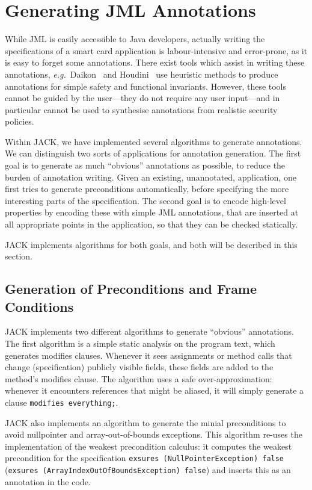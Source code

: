 \section{Generating JML Annotations}\label{SecAnnotGen}

While JML is easily accessible to Java developers, actually writing
the specifications of a smart card application is labour-intensive and
error-prone, as it is easy to forget some annotations. There
exist tools which assist in writing these annotations,
\emph{e.g.}~Daikon~\cite{ErnstCGN01} and Houdini~\cite{FlanaganL01}
use heuristic methods to produce annotations for simple safety and
functional invariants.  However, these tools cannot be guided by the
user---they do not require any user input---and in particular cannot
be used to synthesise annotations from realistic security policies.

Within JACK, we have implemented several algorithms to generate
annotations. We can distinguish two sorts of applications for
annotation generation. The first goal is to generate as much
``obvious'' annotations as possible, to reduce the burden of
annotation writing. Given an existing, unannotated, application, one
first tries to generate preconditions automatically, before specifying
the more interesting parts of the specification. The second goal is to
encode high-level properties by encoding these with simple JML
annotations, that are inserted at all appropriate points in the
application, so that they can be checked statically.

JACK implements algorithms for both goals, and both will be described
in this section.


\subsection{Generation of Preconditions and Frame Conditions}
JACK implements two different algorithms to generate ``obvious''
annotations. The first algorithm is a simple static analysis on the
program text, which generates modifies clauses. Whenever it sees
assignments or method calls that change (specification) publicly
visible fields, these fields are added to the method's modifies
clause. The algorithm uses a safe over-approximation: whenever it
encounters references that might be aliased, it will simply generate a
clause \texttt{modifies \bsl everything;}.

JACK also implements an algorithm to generate the minial preconditions
to avoid nullpointer and array-out-of-bounds exceptions. This
algorithm re-uses the implementation of the weakest precondition
calculus: it computes the weakest precondition for the specification
\texttt{exsures (NullPointerException) false} (\texttt{exsures
(ArrayIndexOutOfBoundsException) false}) and inserts this as an
annotation in the code. 

